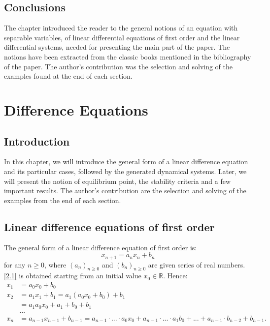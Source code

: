 \documentclass[a4paper,11pt]{report}
\newcommand{\R}{\mathbb{R}}
\begin{document}
\section{Conclusions}
The chapter introduced the reader to the general notions of an equation with separable variables, of linear differential equations of first order and the linear differential systems, needed for presenting the main part of the paper. The notions have been extracted from the classic books mentioned in the bibliography of the paper. The author's contribution was the selection and solving of the examples found at the end of each section.

    
    
    \chapter{Difference Equations}
    \section{Introduction}
    In this chapter, we will introduce the general form of a linear difference equation and its particular cases, followed by the generated dynamical systems. Later, we will present the notion of equilibrium point, the stability criteria and a few important results. The author's contribution are the selection and solving of the examples from the end of each section.
    \section{Linear difference equations of first order}
    The general form of a linear difference equation of first order is:
    \begin{equation} 
     x_{n+1}=a_{n}x_{n}+b_{n} \label{2.1}
    \end{equation}
    for any $n \geq 0$, where $(a_{n})_{n\geq 0}$ and $(b_{n})_{n\geq 0}$ are given series of real numbers. 
\eqref{2.1} is obtained starting from an initial value $x_{0} \in \R$. Hence:
\begin{align*}
 x_{1} & =a_{0}x_{0}+b_{0}\\
   x_{2} & =a_{1}x_{1}+b_{1} = a_{1}(a_{0}x_{0}+b_{0})+b_{1}\\
  & = a_{1}a_{0}x_{0}+a_{1}+b_{0}+b_{1}\\
  & ...\\
   x_{n}&=a_{n-1}x_{n-1}+b_{n-1} = a_{n-1}\cdot ... \cdot a_{0}x_{0}+a_{n-1}\cdot ...\cdot a_{1}b_{0}+...+a_{n-1}\cdot b_{n-2}+b_{n-1}.
\end{align*}
\end{document}

